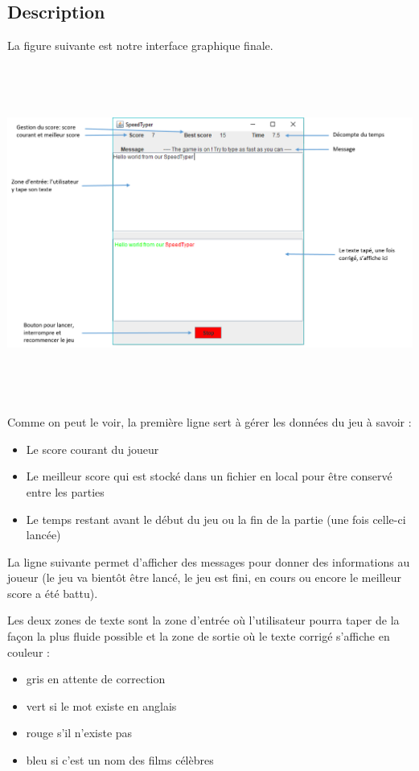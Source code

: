 \documentclass[a4paper,11pt]{article}
\begin{document}
\subsection{Description}
La figure suivante est notre interface graphique finale.\par
\begin{center}
\includegraphics[width = 17cm, height = 11cm]{interfaceGraphique.png}
\end{center}\par
Comme on peut le voir, la première ligne sert à gérer les données du jeu à savoir :
\begin{itemize}
\item Le score courant du joueur
\item Le meilleur score qui est stocké dans un fichier en local pour être conservé entre les parties
\item Le temps restant avant le début du jeu ou la fin de la partie (une fois celle-ci lancée)
\end{itemize}\par
La ligne suivante permet d'afficher des messages pour donner des informations au joueur (le jeu va bientôt être lancé, le jeu est fini, en cours ou encore le meilleur score a été battu).\par
Les deux zones de texte sont la zone d'entrée où l'utilisateur pourra taper de la façon la plus fluide possible et la zone de sortie où le texte corrigé s'affiche en couleur :
\begin{itemize}
\item gris en attente de correction
\item vert si le mot existe en anglais
\item rouge s'il n'existe pas
\item bleu si c'est un nom des films célèbres
\end{itemize}
\end{document}
